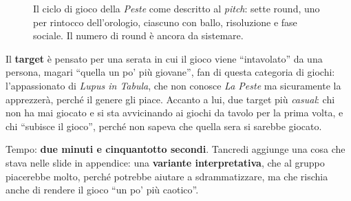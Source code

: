 \begin{figure}[htbp]
\centering
{}
\caption{Il ciclo di gioco della \emph{Peste} come descritto al \emph{pitch}: sette
round, uno per rintocco dell'orologio, ciascuno con ballo, risoluzione e fase sociale.
Il numero di round è ancora da sistemare.}
\label{a11:fig:round}
\end{figure}

Il \textbf{target} è pensato per una serata in cui il gioco viene ``intavolato'' da una
persona, magari ``quella un po' più giovane'', fan di questa categoria di giochi:
l'appassionato di \emph{Lupus in Tabula}, che non conosce \emph{La Peste} ma sicuramente
la apprezzerà, perché il genere gli piace. Accanto a lui, due target più
\emph{casual}: chi non ha mai giocato e si sta avvicinando ai giochi da tavolo per la
prima volta, e chi ``subisce il gioco'', perché non sapeva che quella sera si sarebbe
giocato.

Tempo: \textbf{due minuti e cinquantotto secondi}. Tancredi aggiunge una cosa che stava
nelle slide in appendice: una \textbf{variante interpretativa}, che al gruppo piacerebbe
molto, perché potrebbe aiutare a sdrammatizzare, ma che rischia anche di rendere il
gioco ``un po' più caotico''.

